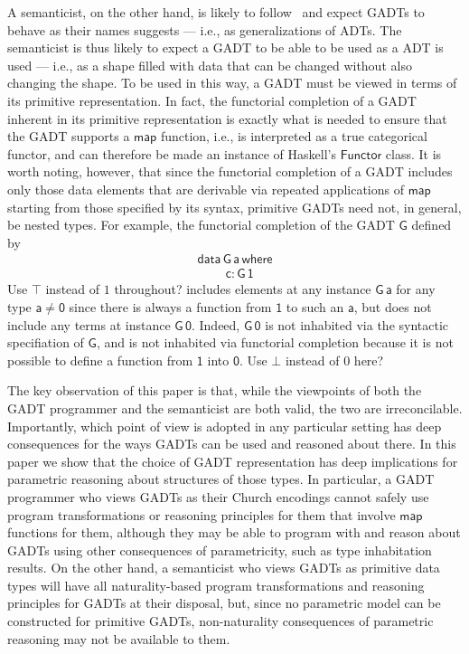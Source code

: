 \documentclass[acmsmall,screen,review,anonymous]{acmart}
\theoremstyle{definition}
\begin{document}
A semanticist, on the other hand, is likely to follow~\cite{bfss90}
and expect GADTs to behave as their names suggests --- i.e., as
generalizations of ADTs. The semanticist is thus likely to expect a
GADT to be able to be used as a ADT is used --- i.e., as a shape
filled with data that can be changed without also changing the
shape. To be used in this way, a GADT must be viewed in terms of its
primitive representation. In fact, the functorial completion of a GADT
inherent in its primitive representation is exactly what is needed to
ensure that the GADT supports a $\mathsf{map}$ function, i.e., is
interpreted as a true categorical functor, and can therefore be made
an instance of Haskell's $\mathsf{Functor}$ class. It is worth noting,
however, that since the functorial completion of a GADT includes only
those data elements that are derivable via repeated applications of
$\mathsf{map}$ starting from those specified by its syntax, primitive
GADTs need not, in general, be nested types. For example, the
functorial completion of the GADT $\mathsf{G}$ defined by
\begin{equation}\label{eq:G}
\begin{array}{l}
\mathsf{data\,G\,a\,where}\\
\mathsf{\;\;\;\;\;\;\;\;c : G\,1}
\end{array}
\end{equation}
{\color{blue} Use $\top$ instead of $1$ throughout?} includes elements
at any instance $\mathsf{G\,a}$ for any type $\mathsf{a} \not =
\mathsf{0}$ since there is always a function from $\mathsf{1}$ to such
an $\mathsf{a}$, but does not include any terms at instance
$\mathsf{G\,0}$. Indeed, $\mathsf{G\,0}$ is not inhabited via the
syntactic specifiation of $\mathsf{G}$, and is not inhabited via
functorial completion because it is not possible to define a function
from $\mathsf{1}$ into $\mathsf{0}$. {\color{blue} Use $\bot$ instead
  of $0$ here?}

The key observation of this paper is that, while the viewpoints of
both the GADT programmer and the semanticist are both valid, the two
are irreconcilable. Importantly, which point of view is adopted in any
particular setting has deep consequences for the ways GADTs can be
used and reasoned about there. In this paper we show that the choice
of GADT representation has deep implications for parametric reasoning
about structures of those types. In particular, a GADT programmer who
views GADTs as their Church encodings cannot safely use program
transformations or reasoning principles for them that involve
$\mathsf{map}$ functions for them, although they may be able to
program with and reason about GADTs using other consequences of
parametricity, such as type inhabitation results. On the other hand, a
semanticist who views GADTs as primitive data types will have all
naturality-based program transformations and reasoning principles for
GADTs at their disposal, but, since no parametric model can be
constructed for primitive GADTs, non-naturality consequences of
parametric reasoning may not be available to them.
\end{document}
